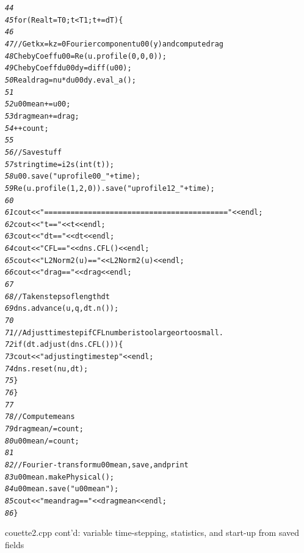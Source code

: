 \documentclass{article}[12pt]
\begin{document}
\begin{Code listing}
\begin{alltt}
\small
{\it 44}
{\it 45}    for (Real t=T0; t<T1; t += dT) \{
{\it 46}
{\it 47}      // Get kx=kz=0 Fourier component u00(y) and compute drag
{\it 48}      ChebyCoeff u00 = Re(u.profile(0,0,0));
{\it 49}      ChebyCoeff du00dy = diff(u00);
{\it 50}      Real drag = nu*du00dy.eval_a();
{\it 51}
{\it 52}      u00mean += u00;
{\it 53}      dragmean += drag;
{\it 54}      ++count;
{\it 55}
{\it 56}      // Save stuff
{\it 57}      string time = i2s(int(t));
{\it 58}      u00.save("uprofile00_"+time);
{\it 59}      Re(u.profile(1,2,0)).save("uprofile12_"+time);
{\it 60}
{\it 61}      cout << "==========================================" << endl;
{\it 62}      cout << "         t == " << t << endl;
{\it 63}      cout << "        dt == " << dt << endl;
{\it 64}      cout << "       CFL == " << dns.CFL() << endl;
{\it 65}      cout << "L2Norm2(u) == " << L2Norm2(u) << endl;
{\it 66}      cout << "      drag == " << drag << endl;
{\it 67}
{\it 68}      // Take n steps of length dt
{\it 69}      dns.advance(u, q, dt.n());
{\it 70}
{\it 71}      // Adjust timestep if CFL number is too large or too small.
{\it 72}      if (dt.adjust(dns.CFL())) \{
{\it 73}        cout << "adjusting timestep" << endl;
{\it 74}        dns.reset(nu, dt);
{\it 75}      \}
{\it 76}    \}
{\it 77}
{\it 78}    // Compute means
{\it 79}    dragmean /= count;
{\it 80}    u00mean /= count;
{\it 81}
{\it 82}    // Fourier-transform u00mean, save, and print
{\it 83}    u00mean.makePhysical();
{\it 84}    u00mean.save("u00mean");
{\it 85}    cout << "mean drag == " << dragmean << endl;
{\it 86} \}
\end{alltt}
\normalsize
\caption{couette2.cpp cont'd: variable time-stepping, statistics,
and start-up from saved fields}
\label{code:couette2b}
\end{Code listing}
\end{document}
